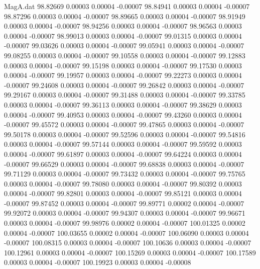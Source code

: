 \begin{filecontents}{MagA.dat}
  98.82669    0.00003    0.00004   -0.00007
  98.84941    0.00003    0.00004   -0.00007
  98.87296    0.00003    0.00004   -0.00007
  98.89665    0.00003    0.00004   -0.00007
  98.91949    0.00003    0.00004   -0.00007
  98.94256    0.00003    0.00004   -0.00007
  98.96563    0.00003    0.00004   -0.00007
  98.99013    0.00003    0.00004   -0.00007
  99.01315    0.00003    0.00004   -0.00007
  99.03626    0.00003    0.00004   -0.00007
  99.05941    0.00003    0.00004   -0.00007
  99.08255    0.00003    0.00004   -0.00007
  99.10558    0.00003    0.00004   -0.00007
  99.12883    0.00003    0.00004   -0.00007
  99.15198    0.00003    0.00004   -0.00007
  99.17530    0.00003    0.00004   -0.00007
  99.19957    0.00003    0.00004   -0.00007
  99.22273    0.00003    0.00004   -0.00007
  99.24608    0.00003    0.00004   -0.00007
  99.26842    0.00003    0.00004   -0.00007
  99.29167    0.00003    0.00004   -0.00007
  99.31488    0.00003    0.00004   -0.00007
  99.33785    0.00003    0.00004   -0.00007
  99.36113    0.00003    0.00004   -0.00007
  99.38629    0.00003    0.00004   -0.00007
  99.40953    0.00003    0.00004   -0.00007
  99.43260    0.00003    0.00004   -0.00007
  99.45572    0.00003    0.00004   -0.00007
  99.47865    0.00003    0.00004   -0.00007
  99.50178    0.00003    0.00004   -0.00007
  99.52596    0.00003    0.00004   -0.00007
  99.54816    0.00003    0.00004   -0.00007
  99.57144    0.00003    0.00004   -0.00007
  99.59592    0.00003    0.00004   -0.00007
  99.61897    0.00003    0.00004   -0.00007
  99.64224    0.00003    0.00004   -0.00007
  99.66529    0.00003    0.00004   -0.00007
  99.68838    0.00003    0.00004   -0.00007
  99.71129    0.00003    0.00004   -0.00007
  99.73432    0.00003    0.00004   -0.00007
  99.75765    0.00003    0.00004   -0.00007
  99.78080    0.00003    0.00004   -0.00007
  99.80392    0.00003    0.00004   -0.00007
  99.82801    0.00003    0.00004   -0.00007
  99.85121    0.00003    0.00004   -0.00007
  99.87452    0.00003    0.00004   -0.00007
  99.89771    0.00002    0.00004   -0.00007
  99.92072    0.00003    0.00004   -0.00007
  99.94307    0.00003    0.00004   -0.00007
  99.96671    0.00003    0.00004   -0.00007
  99.98976    0.00002    0.00004   -0.00007
 100.01325    0.00002    0.00004   -0.00007
 100.03655    0.00002    0.00004   -0.00007
 100.06090    0.00003    0.00004   -0.00007
 100.08315    0.00003    0.00004   -0.00007
 100.10636    0.00003    0.00004   -0.00007
 100.12961    0.00003    0.00004   -0.00007
 100.15269    0.00003    0.00004   -0.00007
 100.17589    0.00003    0.00004   -0.00007
 100.19923    0.00003    0.00004   -0.00008

\end{filecontents}
